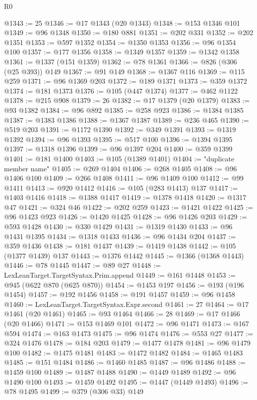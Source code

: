 \begin{lexlean}{R0}
\begin{coremodule}
@1343 := 25
@1346 := @17 @1343 (@20 @1343)
@1348 := @153 @1346 @101
@1349 := @96 @1348
@1350 := @180 @881
@1351 := @202 @331
@1352 := @202 @1351
@1353 := @597 @1352
@1354 := @1350 @1353
@1356 := @96 @1354 @100
@1357 := @177 @1356
@1358 := @1349 @1357
@1359 := @1342 @1358
@1361 := @1337 (@151 @1359)
@1362 := @78 @1361
@1366 := @826 (@306 (@25 @393)) @149
@1367 := @91 @149
@1368 := @1367 @116
@1369 := @115 @259
@1371 := @96 @1369 @203
@1372 := @189 @1371
@1373 := @359 @1372
@1374 := @181 @1373
@1376 := @105 (@447 @1374)
@1377 := @462 @1122
@1378 := @215 @908
@1379 := 26
@1382 := @17 @1379 (@20 @1379)
@1383 := @93 @1382
@1384 := @96 @892
@1385 := @258 @923
@1386 := @1384 @1385
@1387 := @1383 @1386
@1388 := @1367 @1387
@1389 := @236 @465
@1390 := @519 @203
@1391 := @1172 @1390
@1392 := @349 @1391
@1393 := @1319 @1392
@1394 := @96 @1393
@1395 := @517 @100
@1396 := @1394 @1395
@1397 := @1318 @1396
@1399 := @96 @1397 @204
@1400 := @359 @1399
@1401 := @181 @1400
@1403 := @105 (@1389 @1401)
@1404 := "duplicate member name"
@1405 := @269 @1404
@1406 := @268 @1405
@1408 := @96 @1406 @100
@1409 := @266 @1408
@1411 := @96 @1409 @100
@1412 := @99 @1411
@1413 := @920 @1412
@1416 := @105 (@283 @1413) @137
@1417 := @1403 @1416
@1418 := @1388 @1417
@1419 := @1378 @1418
@1420 := @1317 @47
@1421 := @324 @46
@1422 := @202 @259
@1423 := @1421 @1422
@1425 := @96 @1423 @923
@1426 := @1420 @1425
@1428 := @96 @1426 @203
@1429 := @593 @1428
@1430 := @330 @1429
@1431 := @1319 @1430
@1433 := @96 @1431 @1395
@1434 := @1318 @1433
@1436 := @96 @1434 @204
@1437 := @359 @1436
@1438 := @181 @1437
@1439 := @1419 @1438
@1442 := @105 (@1377 @1439) @137
@1443 := @1376 @1442
@1445 := @1366 (@1368 @1443)
@1446 := @78 @1445
@1447 := @89 @27
@1448 := LexLeanTarget.TargetSyntax.Prim.append
@1449 := @161 @1448
@1453 := @945 (@622 @870 (@625 @870))
@1454 := @1453 @197
@1456 := @193 (@196 @1454)
@1457 := @192 @1456
@1458 := @191 @1457
@1459 := @96 @1458
@1460 := LexLeanTarget.TargetSyntax.Expr.second
@1461 := 27
@1464 := @17 @1461 (@20 @1461)
@1465 := @93 @1464
@1466 := 28
@1469 := @17 @1466 (@20 @1466)
@1471 := @153 @1469 @101
@1472 := @96 @1471
@1473 := @167 @594
@1474 := @163 @1473
@1475 := @96 @1474
@1476 := @553 @27
@1477 := @324 @1476
@1478 := @184 @203
@1479 := @1477 @1478
@1481 := @96 @1479 @100
@1482 := @1475 @1481
@1483 := @1472 @1482
@1484 := @1465 @1483
@1485 := @151 @1484
@1486 := @1460 @1485
@1487 := @96 @1486
@1488 := @1459 @100
@1489 := @1487 @1488
@1490 := @1449 @1489
@1492 := @96 @1490 @100
@1493 := @1459 @1492
@1495 := @1447 (@1449 @1493)
@1496 := @78 @1495
@1499 := @379 (@306 @33) @149

\end{coremodule}
\end{lexlean}
